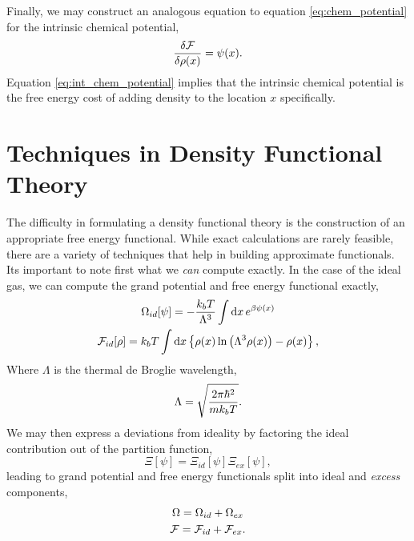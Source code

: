 Finally, we may construct an analogous equation to equation
\ref{eq:chem_potential} for the intrinsic chemical potential,
%
\begin{equation}
    \label{eq:int_chem_potential} 
    \frac{\delta \mathcal{F}}{\delta \rho(x)} = \psi(x).
\end{equation}
%
Equation \ref{eq:int_chem_potential} implies that the intrinsic chemical
potential is the free energy cost of adding density to the location $x$
specifically. 

\section{Techniques in Density Functional Theory} %

The difficulty in formulating a density functional theory is the construction
of an appropriate free energy functional.  While exact calculations are rarely
feasible, there are a variety of techniques that help in building approximate
functionals.  Its important to note first what we \textit{can} compute exactly.
In the case of the ideal gas, we can compute the grand potential and free
energy functional exactly,
%
\begin{gather}
    \Omega_{id}[\psi] = -\frac{k_bT}{\Lambda^{3}} 
        \int\mathrm{d}x\,e^{\beta\psi(x)} \\ 
    \mathcal{F}_{id}[\rho] = k_bT\int \mathrm{d}x
        \left\lbrace \rho(x) \ln\left(\Lambda^3\rho(x)\right) - \rho(x) \right\rbrace,
    \label{F_ideal}
\end{gather}
% 
Where $\Lambda$ is the thermal de Broglie wavelength,
%
\begin{equation}
    \Lambda = \sqrt{\frac{2 \pi \hbar^2}{m k_b T}}.
\end{equation}
%
We may then express a deviations from ideality by factoring the ideal
contribution out of the partition function,
%
\begin{equation}
    \Xi[\psi] = \Xi_{id}[\psi]\Xi_{ex}[\psi],
\end{equation}
%
leading to grand potential and free energy functionals split into ideal and
\textit{excess} components,
%
\begin{gather}
    \Omega = \Omega_{id} + \Omega_{ex} \\
    \mathcal{F} = \mathcal{F}_{id} + \mathcal{F}_{ex}.
\end{gather}

